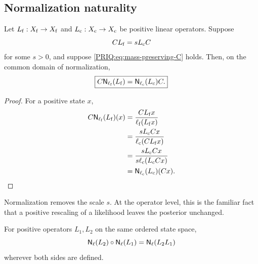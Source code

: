 \subsection{Normalization naturality}

\begin{PRIQtheorem}\label{PRIQ:thm:normalized-transfer-naturality}
Let $L_{\mathrm f}:X_{\mathrm f}\to X_{\mathrm f}$ and $L_{\mathrm c}:X_{\mathrm c}\to X_{\mathrm c}$ be positive linear operators.  Suppose
\begin{equation}\label{PRIQ:eq:positive-intertwining}
  CL_{\mathrm f}=sL_{\mathrm c}C
\end{equation}
for some $s>0$, and suppose \eqref{PRIQ:eq:mass-preserving-C} holds.  Then, on the common domain of normalization,
\begin{equation}\label{PRIQ:eq:normalized-transfer-naturality}
  \boxed{
  C\mathsf N_{\ell_{\mathrm f}}(L_{\mathrm f})
  =
  \mathsf N_{\ell_{\mathrm c}}(L_{\mathrm c})C.}
\end{equation}
\end{PRIQtheorem}

\begin{proof}
For a positive state $x$,
\begin{align*}
C\mathsf N_{\ell_{\mathrm f}}(L_{\mathrm f})(x)
&=
\frac{CL_{\mathrm f}x}{\ell_{\mathrm f}(L_{\mathrm f}x)}\\
&=
\frac{sL_{\mathrm c}Cx}{\ell_{\mathrm c}(CL_{\mathrm f}x)}\\
&=
\frac{sL_{\mathrm c}Cx}{s\ell_{\mathrm c}(L_{\mathrm c}Cx)}\\
&=
\mathsf N_{\ell_{\mathrm c}}(L_{\mathrm c})(Cx).
\end{align*}
\end{proof}

\begin{PRIQremark}
Normalization removes the scale $s$.  At the operator level, this is the familiar fact that a positive rescaling of a likelihood leaves the posterior unchanged.
\end{PRIQremark}

\begin{PRIQproposition}\label{PRIQ:prop:normalized-composition}
For positive operators $L_1,L_2$ on the same ordered state space,
\begin{equation}\label{PRIQ:eq:normalized-composition}
  \mathsf N_{\ell}(L_2)
  \circ
  \mathsf N_{\ell}(L_1)
  =
  \mathsf N_{\ell}(L_2L_1)
\end{equation}
wherever both sides are defined.
\end{PRIQproposition}

